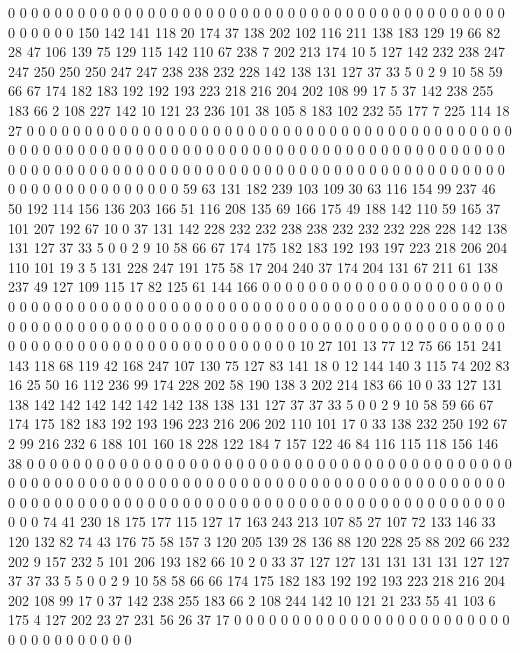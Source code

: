 0 0 0 0 0 0 0 0 0 0 0 0 0 0 0 0 0 0 0 0
0 0 0 0 0 0 0 0 0 0 0 0 0 0 0 0 0 0 0 0
0 0 0 0 0 0 0 0 0 150 142 141 118 20 174 37 138 202 102 116
211 138 183 129 19 66 82 28 47 106 139 75 129 115 142 110 67 238 7 202
213 174 10 5 127 142 232 238 247 247 250 250 250 247 247 238 238 232 228 142
138 131 127 37 33 5 0 2 9 10 58 59 66 67 174 182 183 192 192 193
223 218 216 204 202 108 99 17 5 37 142 238 255 183 66 2 108 227 142 10
121 23 236 101 38 105 8 183 102 232 55 177 7 225 114 18 27 0 0 0
0 0 0 0 0 0 0 0 0 0 0 0 0 0 0 0 0 0 0 0
0 0 0 0 0 0 0 0 0 0 0 0 0 0 0 0 0 0 0 0
0 0 0 0 0 0 0 0 0 0 0 0 0 0 0 0 0 0 0 0
0 0 0 0 0 0 0 0 0 0 0 0 0 0 0 0 0 0 0 0
0 0 0 0 0 0 0 0 0 0 0 0 0 0 0 0 0 0 0 0
0 0 0 0 0 0 0 0 0 0 0 0 0 0 0 0 0 0 0 0
0 0 0 0 0 0 0 0 0 0 0 0 0 0 0 0 0 0 0 0
59 63 131 182 239 103 109 30 63 116 154 99 237 46 50 192 114 156 136 203
166 51 116 208 135 69 166 175 49 188 142 110 59 165 37 101 207 192 67 10
0 37 131 142 228 232 232 238 238 232 232 232 228 228 142 138 131 127 37 33
5 0 0 2 9 10 58 66 67 174 175 182 183 192 193 197 223 218 206 204
110 101 19 3 5 131 228 247 191 175 58 17 204 240 37 174 204 131 67 211
61 138 237 49 127 109 115 17 82 125 61 144 166 0 0 0 0 0 0 0
0 0 0 0 0 0 0 0 0 0 0 0 0 0 0 0 0 0 0 0
0 0 0 0 0 0 0 0 0 0 0 0 0 0 0 0 0 0 0 0
0 0 0 0 0 0 0 0 0 0 0 0 0 0 0 0 0 0 0 0
0 0 0 0 0 0 0 0 0 0 0 0 0 0 0 0 0 0 0 0
0 0 0 0 0 0 0 0 0 0 0 0 0 0 0 0 0 0 0 0
0 0 0 0 0 0 0 0 0 0 0 0 0 0 0 0 0 0 0 0
0 0 0 0 0 10 27 101 13 77 12 75 66 151 241 143 118 68 119 42
168 247 107 130 75 127 83 141 18 0 12 144 140 3 115 74 202 83 16 25
50 16 112 236 99 174 228 202 58 190 138 3 202 214 183 66 10 0 33 127
131 138 142 142 142 142 142 142 138 138 131 127 37 37 33 5 0 0 2 9
10 58 59 66 67 174 175 182 183 192 193 196 223 216 206 202 110 101 17 0
33 138 232 250 192 67 2 99 216 232 6 188 101 160 18 228 122 184 7 157
122 46 84 116 115 118 156 146 38 0 0 0 0 0 0 0 0 0 0 0
0 0 0 0 0 0 0 0 0 0 0 0 0 0 0 0 0 0 0 0
0 0 0 0 0 0 0 0 0 0 0 0 0 0 0 0 0 0 0 0
0 0 0 0 0 0 0 0 0 0 0 0 0 0 0 0 0 0 0 0
0 0 0 0 0 0 0 0 0 0 0 0 0 0 0 0 0 0 0 0
0 0 0 0 0 0 0 0 0 0 0 0 0 0 0 0 0 0 0 0
0 0 0 0 0 0 0 0 0 0 0 0 0 0 0 0 0 0 0 0
74 41 230 18 175 177 115 127 17 163 243 213 107 85 27 107 72 133 146 33
120 132 82 74 43 176 75 58 157 3 120 205 139 28 136 88 120 228 25 88
202 66 232 202 9 157 232 5 101 206 193 182 66 10 2 0 33 37 127 127
131 131 131 131 127 127 37 37 33 5 5 0 0 2 9 10 58 58 66 66
174 175 182 183 192 192 193 223 218 216 204 202 108 99 17 0 37 142 238 255
183 66 2 108 244 142 10 121 21 233 55 41 103 6 175 4 127 202 23 27
231 56 26 37 17 0 0 0 0 0 0 0 0 0 0 0 0 0 0 0
0 0 0 0 0 0 0 0 0 0 0 0 0 0 0 0 0 0 0 0

